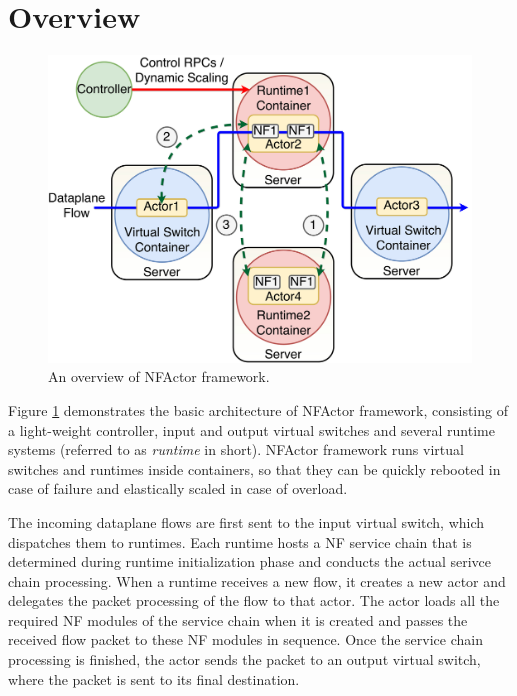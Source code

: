 \section {Overview}

\begin{figure}[!t]
  \centering
  \includegraphics[width=\columnwidth]{figure/final-final-nfactor-cluster.pdf}
  \caption{An overview of NFActor framework.}
  \label{fig:runtime}
\end{figure}

Figure \ref{fig:runtime} demonstrates the basic architecture of NFActor framework, consisting of a light-weight controller, input and output virtual switches and several runtime systems (referred to as \textit{runtime} in short). NFActor framework runs virtual switches and runtimes inside containers, so that they can be quickly rebooted in case of failure and elastically scaled in case of overload.

The incoming dataplane flows are first sent to the input virtual switch, which dispatches them to runtimes. Each runtime hosts a NF service chain that is determined during runtime initialization phase and conducts the actual serivce chain processing. When a runtime receives a new flow, it creates a new actor and delegates the packet processing of the flow to that actor. The actor loads all the required NF modules of the service chain when it is created and passes the received flow packet to these NF modules in sequence. Once the service chain processing is finished, the actor sends the packet to an output virtual switch, where the packet is sent to its final destination.

